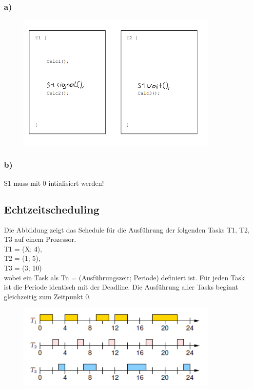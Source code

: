 \subsubsection{a)}
\begin{figure}[H]
  \includegraphics[width=10cm]{images/KA280521/3a.PNG}
  \centering
\end{figure}

\subsubsection{b)}
S1 muss mit 0 intialisiert werden!

\subsection{Echtzeitscheduling}
Die Abbildung zeigt das Schedule für die Ausführung der folgenden Tasks T1, T2, T3 auf einem Prozessor.\\
T1 = (X; 4),\\
T2 = (1; 5),\\
T3 = (3; 10)\\
wobei ein Task als Tn = (Ausführungszeit; Periode) definiert ist. Für jeden Task ist die Periode identisch mit
der Deadline. Die Ausführung aller Tasks beginnt gleichzeitig zum Zeitpunkt 0.
\begin{figure}[H]
  \includegraphics[width=10cm]{images/KA280521/4a.PNG}
  \centering
\end{figure}

